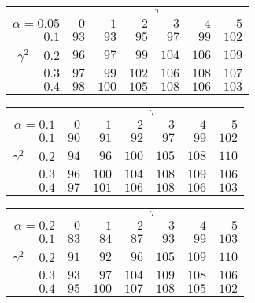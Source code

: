 \begin{tabular}{r|rrrrrr}
\hline\hline
 &\multicolumn{6}{c}{$\tau$} \\ 
 $\alpha = 0.05$ & $0$ & $1$ & $2$ & $3$ & $4$ & $5$ \\ 
 \hline$0.1$ & $ 93$ & $ 93$ & $ 95$ & $ 97$ & $ 99$ & $102$\\ 
$\gamma^2\;\;\;$ $0.2$ & $ 96$ & $ 97$ & $ 99$ & $104$ & $106$ & $109$\\ 
$0.3$ & $ 97$ & $ 99$ & $102$ & $106$ & $108$ & $107$\\ 
$0.4$ & $ 98$ & $100$ & $105$ & $108$ & $106$ & $103$\\ 
 \hline 
 \end{tabular}
 
 \vspace{2em} 
 
\begin{tabular}{r|rrrrrr}
\hline\hline
 &\multicolumn{6}{c}{$\tau$} \\ 
 $\alpha = 0.1$ & $0$ & $1$ & $2$ & $3$ & $4$ & $5$ \\ 
 \hline$0.1$ & $ 90$ & $ 91$ & $ 92$ & $ 97$ & $ 99$ & $102$\\ 
$\gamma^2\;\;\;$ $0.2$ & $ 94$ & $ 96$ & $100$ & $105$ & $108$ & $110$\\ 
$0.3$ & $ 96$ & $100$ & $104$ & $108$ & $109$ & $106$\\ 
$0.4$ & $ 97$ & $101$ & $106$ & $108$ & $106$ & $103$\\ 
 \hline 
 \end{tabular}
 
 \vspace{2em} 
 
\begin{tabular}{r|rrrrrr}
\hline\hline
 &\multicolumn{6}{c}{$\tau$} \\ 
 $\alpha = 0.2$ & $0$ & $1$ & $2$ & $3$ & $4$ & $5$ \\ 
 \hline$0.1$ & $ 83$ & $ 84$ & $ 87$ & $ 93$ & $ 99$ & $103$\\ 
$\gamma^2\;\;\;$ $0.2$ & $ 91$ & $ 92$ & $ 96$ & $105$ & $109$ & $110$\\ 
$0.3$ & $ 93$ & $ 97$ & $104$ & $109$ & $108$ & $106$\\ 
$0.4$ & $ 95$ & $100$ & $107$ & $108$ & $105$ & $102$\\ 
 \hline 
 \end{tabular}